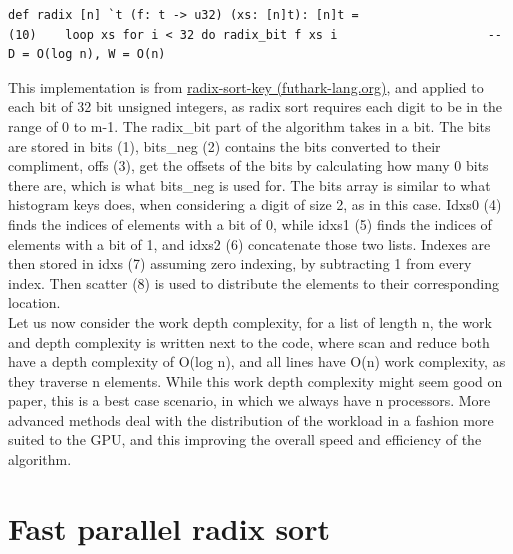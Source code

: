 \documentclass{article}
\begin{document}
\begin{itemize}
\begin{lstlisting}
def radix [n] `t (f: t -> u32) (xs: [n]t): [n]t = 
(10)    loop xs for i < 32 do radix_bit f xs i                     -- D = O(log n), W = O(n)
\end{lstlisting}

This implementation is from \href{https://futhark-lang.org/examples/radix-sort-key.html}{radix-sort-key (futhark-lang.org)}, and applied to each bit of 32 bit unsigned integers, as radix sort requires each digit to be in the range of 0 to m-1. The radix\_bit part of the algorithm takes in a bit. The bits are stored in bits (1), bits\_neg (2) contains the bits converted to their compliment, offs (3), get the offsets of the bits by calculating how many 0 bits there are, which is what bits\_neg is used for. The bits array is similar to what histogram keys does, when considering a digit of size 2, as in this case. Idxs0 (4) finds the indices of elements with a bit of 0, while idxs1 (5) finds the indices of elements with a bit of 1, and idxs2 (6) concatenate those two lists. Indexes are then stored in idxs (7) assuming zero indexing, by subtracting 1 from every index. Then scatter (8) is used to distribute the elements to their corresponding location.
\\
Let us now consider the work depth complexity, for a list of length n, the work and depth complexity is written next to the code, where scan and reduce both have a depth complexity of O(log n), and all lines have O(n) work complexity, as they traverse n elements. While this work depth complexity might seem good on paper, this is a best case scenario, in which we always have n processors. More advanced methods deal with the distribution of the workload in a fashion more suited to the GPU, and this improving the overall speed and efficiency of the algorithm. 
\end{itemize}

\section{Fast parallel radix sort}
\end{document}
